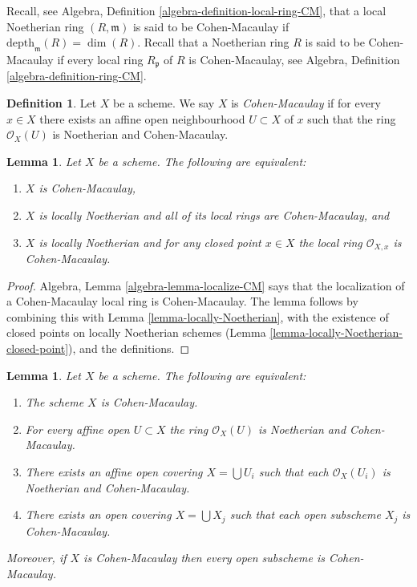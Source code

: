 \documentclass{stacks-project}
\theoremstyle{plain}
\newtheorem{lemma}[subsection]{Lemma}
\theoremstyle{definition}
\newtheorem{definition}[subsection]{Definition}
\theoremstyle{remark}
\numberwithin{equation}{subsection}
\begin{document}
\noindent
Recall, see Algebra, Definition \ref{algebra-definition-local-ring-CM},
that a local Noetherian ring $(R, \mathfrak m)$ is
said to be Cohen-Macaulay if $\text{depth}_{\mathfrak m}(R) = \dim(R)$.
Recall that a Noetherian ring $R$ is said to be Cohen-Macaulay if
every local ring $R_{\mathfrak p}$ of $R$ is Cohen-Macaulay,
see Algebra, Definition \ref{algebra-definition-ring-CM}.

\begin{definition}
\label{definition-Cohen-Macaulay}
Let $X$ be a scheme. We say $X$ is {\it Cohen-Macaulay} if
for every $x \in X$ there exists an affine open neighbourhood
$U \subset X$ of $x$ such that the ring $\mathcal{O}_X(U)$ is
Noetherian and Cohen-Macaulay.
\end{definition}

\begin{lemma}
\label{lemma-characterize-Cohen-Macaulay}
Let $X$ be a scheme. The following are equivalent:
\begin{enumerate}
\item $X$ is Cohen-Macaulay,
\item $X$ is locally Noetherian and all of its local rings are Cohen-Macaulay,
and
\item $X$ is locally Noetherian and for any closed point $x \in X$
the local ring $\mathcal{O}_{X, x}$ is Cohen-Macaulay.
\end{enumerate}
\end{lemma}

\begin{proof}
Algebra, Lemma \ref{algebra-lemma-localize-CM} says that the localization of
a Cohen-Macaulay local ring is Cohen-Macaulay. The lemma follows
by combining this with Lemma \ref{lemma-locally-Noetherian},
with the existence of closed
points on locally Noetherian schemes
(Lemma \ref{lemma-locally-Noetherian-closed-point}), and
the definitions.
\end{proof}

\begin{lemma}
\label{lemma-locally-Cohen-Macaulay}
Let $X$ be a scheme. The following are equivalent:
\begin{enumerate}
\item The scheme $X$ is Cohen-Macaulay.
\item For every affine open $U \subset X$ the ring $\mathcal{O}_X(U)$
is Noetherian and Cohen-Macaulay.
\item There exists an affine open covering $X = \bigcup U_i$ such that
each $\mathcal{O}_X(U_i)$ is Noetherian and Cohen-Macaulay.
\item There exists an open covering $X = \bigcup X_j$
such that each open subscheme $X_j$ is Cohen-Macaulay.
\end{enumerate}
Moreover, if $X$ is Cohen-Macaulay then every open subscheme
is Cohen-Macaulay.
\end{lemma}
\end{document}
